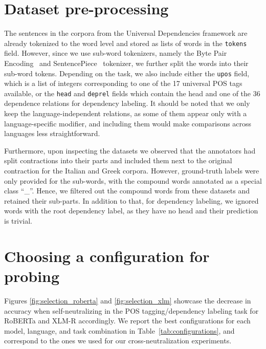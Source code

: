\documentclass[11pt,a4paper]{article}
\begin{document}
\section{Dataset pre-processing}
\label{app:dataset_preprocess}
The sentences in the corpora from the Universal Dependencies framework are already tokenized to the word level and stored as lists of words in the \texttt{tokens} field. However, since we use sub-word tokenizers, namely the Byte Pair Encoding~\citep{sennrich_neural_2016} and SentencePiece~\citep{kudo_sentencepiece_2018} tokenizer, we further split the words into their sub-word tokens. Depending on the task, we also include either the \texttt{upos} field, which is a list of integers corresponding to one of the 17 universal POS tags available, or the \texttt{head} and \texttt{deprel} fields which contain the head and one of the 36 dependence relations for dependency labeling\footnotemark. It should be noted that we only keep the language-independent relations, as some of them appear only with a language-specific modifier, and including them would make comparisons across languages less straightforward.

Furthermore, upon inspecting the datasets we observed that the annotators had split contractions into their parts and included them next to the original contraction for the Italian and Greek corpora. However, ground-truth labels were only provided for the sub-words, with the compound words annotated as a special class ``\_''. Hence, we filtered out the compound words from these datasets and retained their sub-parts. In addition to that, for dependency labeling, we ignored words with the root dependency label, as they have no head and their prediction is trivial.

\section{Choosing a configuration for probing}
\label{app:probe_config}
Figures \ref{fig:selection_roberta} and \ref{fig:selection_xlm} showcase the decrease in accuracy when self-neutralizing in the POS tagging/dependency labeling task for RoBERTa and XLM-R accordingly. We report the best configurations for each model, language, and task combination in Table~\ref{tab:configurations}, and correspond to the ones we used for our cross-neutralization experiments.
\end{document}
